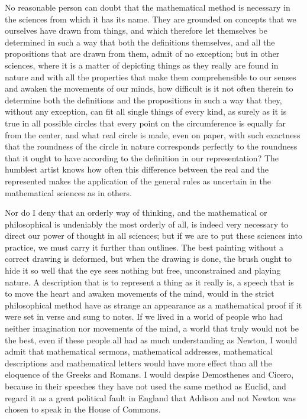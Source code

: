 \documentclass[12pt,a4paper,openany]{book}
\newcommand{\opage}[1]{\marginnote{\footnotesize\textit{[#1]}}}
\begin{document}
No reasonable person can doubt that the mathematical method is necessary in the
sciences from which it has its name. They are grounded on concepts that we
ourselves have drawn from things, and which therefore let themselves be determined
in such a way that both the definitions themselves, and all the propositions that
are drawn from them, admit of no exception; but in other sciences, where it is a
matter of depicting things as they really are found in nature and with all the
properties that make them comprehensible to our senses and awaken the movements of
our minds, how difficult is it not often therein to determine both the definitions
and the propositions in such a way that they, without any exception, can fit all
single things of every kind, as surely as it is true in all possible circles that
every point on the circumference is equally far from the center, and what real
circle is made, even on paper, with such exactness that the roundness of the
circle in nature corresponds perfectly to the roundness that it ought to have
according to the definition in our representation? The humblest artist knows how
often this difference between the real and the represented makes the application
of the general rules as uncertain in the mathematical sciences as in others.

Nor do I deny that an orderly way of thinking, and the mathematical or
philosophical is undeniably the most orderly of all, is indeed very necessary to
direct our power of thought in all sciences; but if we are to put these sciences
\setcounter{footnote}{0}%
\opage{30}into practice, we must carry it further than outlines. The best painting
without a correct drawing is deformed, but when the drawing is done, the brush
ought to hide it so well that the eye sees nothing but free, unconstrained and
playing nature. A description that is to represent a thing as it really is, a
speech that is to move the heart and awaken movements of the mind, would in the
strict philosophical method have as strange an appearance as a mathematical proof
if it were set in verse and sung to notes. If we lived in a world of people who had
neither imagination nor movements of the mind, a world that truly would not be the
best, even if these people all had as much understanding as Newton, I would admit
that mathematical sermons, mathematical addresses, mathematical descriptions and
mathematical letters would have more effect than all the eloquence of the Greeks
and Romans. I would despise Demosthenes and Cicero, because in their speeches they
have not used the same method as Euclid, and regard it as a great political fault in
England that Addison and not Newton was chosen to speak in the House of Commons.
\end{document}
